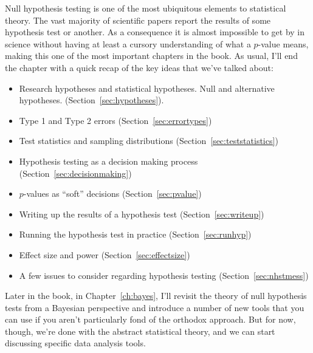 Null hypothesis testing is one of the most ubiquitous elements to statistical theory. The vast majority of scientific papers report the results of some hypothesis test or another. As a consequence it is almost impossible to get by in science without having at least a cursory understanding of what a $p$-value means, making this one of the most important chapters in the book. As usual, I'll end the chapter with a quick recap of the key ideas that we've talked about:

\begin{itemize} \itemsep -2pt
\item Research hypotheses and statistical hypotheses. Null and alternative hypotheses. (Section~\ref{sec:hypotheses}).
\item Type 1 and Type 2 errors (Section~\ref{sec:errortypes})
\item Test statistics and sampling distributions (Section~\ref{sec:teststatistics})
\item Hypothesis testing as a decision making process (Section~\ref{sec:decisionmaking})
\item $p$-values as ``soft'' decisions (Section~\ref{sec:pvalue})
\item Writing up the results of a hypothesis test (Section~\ref{sec:writeup})
\item Running the hypothesis test in practice (Section~\ref{sec:runhyp})
\item Effect size and power (Section~\ref{sec:effectsize})
\item A few issues to consider regarding hypothesis testing (Section~\ref{sec:nhstmess})
\end{itemize}

\noindent
Later in the book, in Chapter~\ref{ch:bayes}, I'll revisit the theory of null hypothesis tests from a Bayesian perspective and introduce a number of new tools that you can use if you aren't particularly fond of the orthodox approach. But for now, though, we're done with the abstract statistical theory, and we can start discussing specific data analysis tools.


